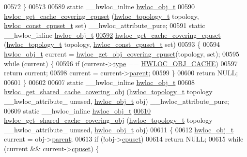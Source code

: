 \begin{DoxyCode}
00572 \}
00573 
00589 \textcolor{keyword}{static} \_\_hwloc\_inline \hyperlink{a00016}{hwloc_obj_t}
00590 \hyperlink{a00057_ga2f936fd9a9c62f6d9b9951de3062e889}{hwloc_get_cache_covering_cpuset} (\hyperlink{a00039_ga9d1e76ee15a7dee158b786c30b6a6e38}{hwloc_topology_t} topology, \hyperlink{a00040_ga1f784433e9b606261f62d1134f6a3b25}{hwloc_const_cpuset_t} 
      \textcolor{keyword}{set}) \_\_hwloc\_attribute\_pure;
00591 static \_\_hwloc\_inline \hyperlink{a00016}{hwloc_obj_t}
\hypertarget{a00031_source_l00592}{}\hyperlink{a00057_ga2f936fd9a9c62f6d9b9951de3062e889}{00592} \hyperlink{a00057_ga2f936fd9a9c62f6d9b9951de3062e889}{hwloc_get_cache_covering_cpuset} (\hyperlink{a00039_ga9d1e76ee15a7dee158b786c30b6a6e38}{hwloc_topology_t} topology, \hyperlink{a00040_ga1f784433e9b606261f62d1134f6a3b25}{hwloc_const_cpuset_t} 
      set)
00593 \{
00594   \hyperlink{a00016}{hwloc_obj_t} current = \hyperlink{a00055_ga68300dd0ee9c36a7a90f275a59e9af28}{hwloc_get_obj_covering_cpuset}(topology, \textcolor{keyword}{set});
00595   \textcolor{keywordflow}{while} (current) \{
00596     \textcolor{keywordflow}{if} (current->\hyperlink{a00016_acc4f0803f244867e68fe0036800be5de}{type} == \hyperlink{a00041_ggacd37bb612667dc437d66bfb175a8dc55a56ee0b7eca88f363b75b34fdde8c9ddc}{HWLOC_OBJ_CACHE})
00597       \textcolor{keywordflow}{return} current;
00598     current = current->\hyperlink{a00016_adc494f6aed939992be1c55cca5822900}{parent};
00599   \}
00600   \textcolor{keywordflow}{return} NULL;
00601 \}
00602 
00607 \textcolor{keyword}{static} \_\_hwloc\_inline \hyperlink{a00016}{hwloc_obj_t}
00608 \hyperlink{a00057_ga000e08a1da039130daa072e77713bb43}{hwloc_get_shared_cache_covering_obj} (\hyperlink{a00039_ga9d1e76ee15a7dee158b786c30b6a6e38}{hwloc_topology_t} topology \_\_hwloc\_attribute\_
      unused, \hyperlink{a00016}{hwloc_obj_t} obj) \_\_hwloc\_attribute\_pure;
00609 \textcolor{keyword}{static} \_\_hwloc\_inline \hyperlink{a00016}{hwloc_obj_t}
\hypertarget{a00031_source_l00610}{}\hyperlink{a00057_ga000e08a1da039130daa072e77713bb43}{00610} \hyperlink{a00057_ga000e08a1da039130daa072e77713bb43}{hwloc_get_shared_cache_covering_obj} (\hyperlink{a00039_ga9d1e76ee15a7dee158b786c30b6a6e38}{hwloc_topology_t} topology \_\_hwloc\_attribute\_
      unused, \hyperlink{a00016}{hwloc_obj_t} obj)
00611 \{
00612   \hyperlink{a00016}{hwloc_obj_t} current = obj->\hyperlink{a00016_adc494f6aed939992be1c55cca5822900}{parent};
00613   \textcolor{keywordflow}{if} (!obj->\hyperlink{a00016_a67925e0f2c47f50408fbdb9bddd0790f}{cpuset})
00614     \textcolor{keywordflow}{return} NULL;
00615   \textcolor{keywordflow}{while} (current && current->\hyperlink{a00016_a67925e0f2c47f50408fbdb9bddd0790f}{cpuset}) \{

\end{DoxyCode}
